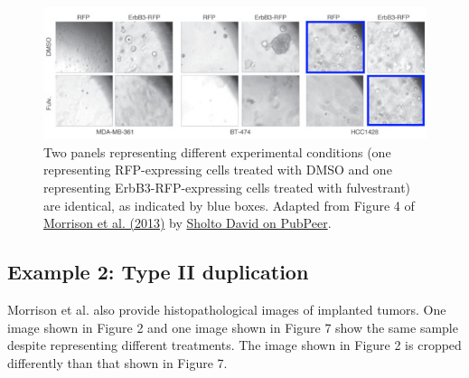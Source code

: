 \documentclass[letterpaper, 12pt]{article}
\begin{document}
\begin{figure}[h!tbp]
    \centering
    \includegraphics[width=\textwidth]{img/image_duplication/image-1744937326665.jpg}
    \caption*{Two panels representing different experimental conditions (one representing RFP-expressing cells treated with DMSO and one representing ErbB3-RFP-expressing cells treated with fulvestrant) are identical, as indicated by blue boxes. Adapted from Figure 4 of \href{https://doi.org/10.1172/JCI66764}{Morrison et al. (2013)} by \href{https://pubpeer.com/publications/2768B5B42E7338AB72D4CFE660596A\#1}{Sholto David on PubPeer}.}
\end{figure}

\pagebreak

\subsection*{Example 2: Type II duplication}

Morrison et al. also provide histopathological images of implanted tumors. One image shown in Figure 2 and one image shown in Figure 7 show the same sample despite representing different treatments. The image shown in Figure 2 is cropped differently than that shown in Figure 7.
\end{document}

